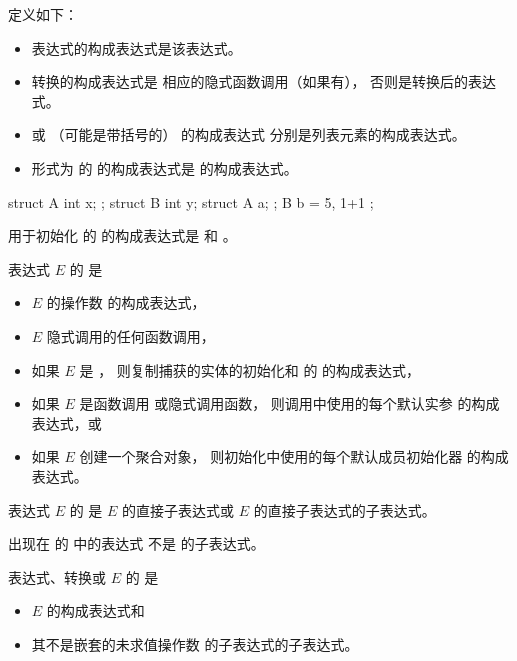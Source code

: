 \pnum
{} 定义如下：
\begin{itemize}
\item
表达式的构成表达式是该表达式。
\item
转换的构成表达式是
相应的隐式函数调用（如果有），
否则是转换后的表达式。
\item
{} 或
（可能是带括号的） 的构成表达式
分别是列表元素的构成表达式。
\item
形式为 \tcode{=}  的 
的构成表达式是  的构成表达式。
\end{itemize}
\begin{example}
\begin{codeblock}
struct A { int x; };
struct B { int y; struct A a; };
B b = { 5, { 1+1 } };
\end{codeblock}
用于初始化  的 
的构成表达式是  和 。
\end{example}

\pnum
表达式 $E$ 的  是
\begin{itemize}
\item
$E$ 的操作数 的构成表达式，
\item
$E$ 隐式调用的任何函数调用，
\item
如果 $E$ 是 ，
则复制捕获的实体的初始化和
 的  的构成表达式，
\item
如果 $E$ 是函数调用 或隐式调用函数，
则调用中使用的每个默认实参
的构成表达式，或
\item
如果 $E$ 创建一个聚合对象，
则初始化中使用的每个默认成员初始化器
的构成表达式。
\end{itemize}

\pnum
表达式 $E$ 的  是
$E$ 的直接子表达式或
$E$ 的直接子表达式的子表达式。
\begin{note}
出现在  的  中的表达式
不是  的子表达式。
\end{note}
表达式、转换或  $E$ 的  是
\begin{itemize}
\item
$E$ 的构成表达式和
\item
其不是嵌套的未求值操作数 的子表达式的子表达式。
\end{itemize}

